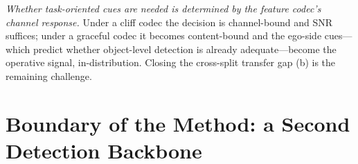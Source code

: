 \documentclass[journal]{IEEEtran}
\begin{document}
\emph{Whether task-oriented cues are needed is determined by the feature codec's channel response.} Under a cliff codec the decision is channel-bound and SNR suffices; under a graceful codec it becomes content-bound and the ego-side cues---which predict whether object-level detection is already adequate---become the operative signal, in-distribution. Closing the cross-split transfer gap (b) is the remaining challenge.

\begin{table}[t]
\centering
\footnotesize
\setlength{\tabcolsep}{3pt}
\caption{Learned-selector edge over the best SNR-threshold rule on the same $2{,}170$ test
frames ($200$-seed protocol), reported two ways. \emph{In-dist.\ edge}: leakage-free $5$-fold
cross-validation on the evaluation split (each frame scored by a selector that never saw it,
$\tau$ tuned on the training folds only). \emph{Deployed edge}: selector trained on validate and
frozen, applied cross-split (the headline protocol). In-distribution the JSCC edge is
$9$--$11{\times}$ the LDPC-cliff edge---an SNR threshold cannot reach it---while under LDPC the
margin is the selector's function form, not a cue gain (cues add no significant F1,
the main paper). The deployed JSCC edge is negative: the validate-trained selector
does not transfer the graceful-channel gain across the domain shift
(Appendix~\ref{sec:jscc_aware}(b)).}
\label{tab:two_regime}
\end{table}

\section{Boundary of the Method: a Second Detection Backbone}\label{sec:second_backbone}
\end{document}
